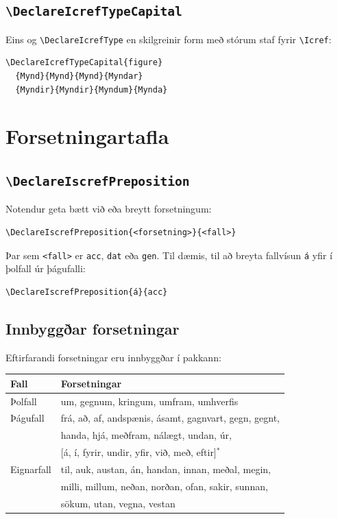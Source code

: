 \documentclass{article}
\begin{document}
\subsection{\texttt{\textbackslash DeclareIcrefTypeCapital}}

Eins og \verb|\DeclareIcrefType| en skilgreinir form með stórum staf
fyrir \verb|\Icref|:

\begin{lstlisting}
\DeclareIcrefTypeCapital{figure}
  {Mynd}{Mynd}{Mynd}{Myndar}
  {Myndir}{Myndir}{Myndum}{Mynda}
\end{lstlisting}

\section{Forsetningartafla}

\subsection{\texttt{\textbackslash DeclareIscrefPreposition}}

Notendur geta bætt við eða breytt forsetningum:

\begin{lstlisting}
\DeclareIscrefPreposition{<forsetning>}{<fall>}
\end{lstlisting}

Þar sem \texttt{<fall>} er \texttt{acc}, \texttt{dat} eða \texttt{gen}.
Til dæmis, til að breyta fallvísun \texttt{á} yfir í þolfall úr þágufalli:

\begin{lstlisting}
\DeclareIscrefPreposition{á}{acc}
\end{lstlisting}

\subsection{Innbyggðar forsetningar}

Eftirfarandi forsetningar eru innbyggðar í pakkann:

\begin{center}
\begin{tabular}{ll}
  \toprule
  Fall & Forsetningar \\
  \midrule
  Þolfall & um, gegnum, kringum, umfram, umhverfis \\
  \midrule
  Þágufall & frá, að, af, andspænis, ásamt, gagnvart, gegn, gegnt, \\
            & handa, hjá, meðfram, nálægt, undan, úr, \\
            & [á, í, fyrir, undir, yfir, við, með, eftir]$^*$ \\
  \midrule
  Eignarfall & til, auk, austan, án, handan, innan, meðal, megin, \\
             & milli, millum, neðan, norðan, ofan, sakir, sunnan, \\
             & sökum, utan, vegna, vestan \\
  \bottomrule
\end{tabular}
\end{center}
\end{document}
